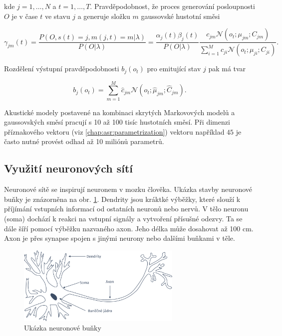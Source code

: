 \noindent kde $j = 1,\dots,N$ a $t = 1, \dots, T$. Pravděpodobnost, že proces generování posloupnosti $O$ je v čase $t$ ve stavu $j$ a generuje složku $m$ gaussovské hustotní směsi

\begin{equation}
  \gamma_{jm}\left(t\right) = \frac{P\left(O, s\left(t\right)=j, m\left(j,t\right)=m|\lambda\right)}{P\left(O|\lambda\right)} = \frac{\alpha_{j}\left(t\right)\beta_{j}\left(t\right)}{P\left(O|\lambda\right)} \frac{c_{jm}\mathcal{N}\left(o_t;\mu_{jm}; C_{jm}\right)}{\sum_{i=1}^{M} c_{ji} \mathcal{N}\left(o_t;\mu_{ji};C_{ji}\right) }.
   \label{eq:asr:acoustic:structure:gamma:one}
 \end{equation}

\noindent Rozdělení výstupní pravděpodobnosti $b_j\left(o_t\right)$ pro emitující stav $j$ pak má tvar

\begin{equation}
   b_{j}\left(o_t\right) = \sum_{m=1}^{M} \hat{c}_{jm} \mathcal{N}\left(o_t; \hat{\mu}_{jm}; \hat{C}_{jm}\right).
   \label{eq:asr:acoustic:gmm:output}
 \end{equation}

\noindent Akustické modely postavené na kombinaci skrytých Markovových modelů a gaussovských směsí pracují s 10 až 100 tisíc hustotních směsí. Při dimenzi příznakového vektoru (viz \ref{chap:asr:parametrization}) vektoru například $45$ je často nutné provést odhad až 10 miliónů parametrů.

\subsection{Využití neuronových sítí}
\label{chap:asr:acoustic:DNN}

Neuronové sítě se inspirují neuronem v mozku člověka. Ukázka stavby neuronové buňky je znázorněna na obr. \ref{fig:asr:acoustic:dnn:neuron:human}. Dendrity jsou kráktké výběžky, které slouží k příjímání vstupních informací od ostatních neuronů nebo nervů. V tělo neuronu (soma) dochází k reakci na vstupní signály a vytvoření přísušné odezvy. Ta se dále šíří pomocí výběžku nazvaného axon. Jeho délka může dosahovat až 100 cm. Axon je přes synapse spojen s jinými neurony nebo dalšími buňkami v těle.

\begin{figure}[hbpt]
  \centering
  \includegraphics[width=0.7\textwidth]{./ch4-asr/img/neuron-human.pdf}
  \caption{Ukázka neuronové buňky}
  \label{fig:asr:acoustic:dnn:neuron:human}
\end{figure}

